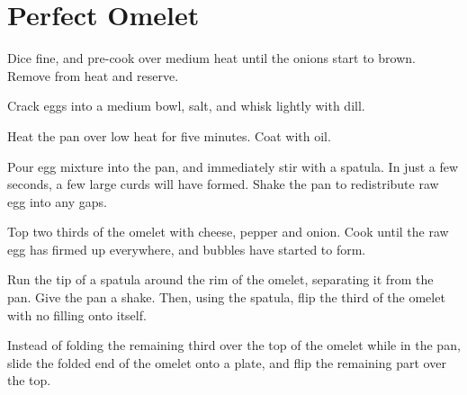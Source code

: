 
\section{Perfect Omelet}
\begin{recipe}



Dice fine, and pre-cook over medium heat until the onions start to brown. Remove from heat and reserve.


Crack eggs into a medium bowl, salt, and whisk lightly with dill.


Heat the pan over low heat for five minutes. Coat with oil.

Pour egg mixture into the pan, and immediately stir with a spatula.
In just a few seconds, a few large curds will have formed. Shake the pan to redistribute raw egg into any gaps.


Top two thirds of the omelet with cheese, pepper and onion. Cook until the raw egg has firmed up everywhere, and bubbles have started to form.

Run the tip of a spatula around the rim of the omelet, separating it from the pan. Give the pan a shake. Then, using the spatula, flip the third of the omelet with no filling onto itself.

Instead of folding the remaining third over the top of the omelet while in the pan, slide the folded end of the omelet onto a plate, and flip the remaining part over the top.

\end{recipe}
